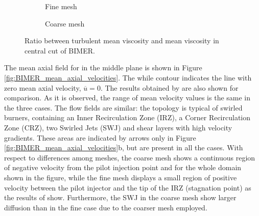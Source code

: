 \clearpage

\begin{figure}[ht]
\centering
\begin{subfigure}[b]{0.45\textwidth}
	\centering
   \caption{Fine mesh}
   \label{fig:field_NU_T_NU_mean_fine}
\end{subfigure}
\begin{subfigure}[b]{0.45\textwidth}
	\centering
   \caption{Coarse mesh}
   \label{fig:field_NU_T_NU_mean_coarse}
\end{subfigure}
\caption[Ratio between turbulent mean viscosity and mean viscosity in central plane]{Ratio between turbulent mean viscosity and mean viscosity in central cut of BIMER.}
\label{fig:BIMER_NU_ratios}
\end{figure}

The mean axial field for in the middle plane is shown in Figure \ref{fig:BIMER_mean_axial_velocities}. The while contour indicates the line with zero mean axial velocity, $\overline{u} = 0$. The results obtained by  are also shown for comparison. As it is observed, the range of mean velocity values is the same in the three cases. The flow fields are similar: the topology is typical of swirled burners, containing an Inner Recirculation Zone (IRZ), a Corner Recirculation Zone (CRZ), two Swirled Jets (SWJ) and shear layers with high velocity gradients. These areas are indicated by arrows only in Figure \ref{fig:BIMER_mean_axial_velocities}b, but are present in all the cases. With respect to differences among meshes, the coarse mesh shows a continuous region of negative velocity from the pilot injection point and for the whole domain shown in the figure, while the fine mesh displays a small region of positive velocity between the pilot injector and the tip of the IRZ (stagnation point) as the results of  show. Furthermore, the SWJ in the coarse mesh show larger diffusion than in the fine case due to the coarser mesh employed.

